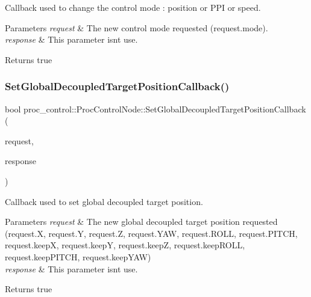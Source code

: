 Callback used to change the control mode \+: position or P\+PI or speed. 
\begin{DoxyParams}{Parameters}
{\em request} & The new control mode requested (request.\+mode). \\
\hline
{\em response} & This parameter isn\textquotesingle{}t use. \\
\hline
\end{DoxyParams}
\begin{DoxyReturn}{Returns}
true 
\end{DoxyReturn}
\mbox{\label{classproc__control_1_1_proc_control_node_a841b03177a02e542bf7f7aa8403c5382}} 
\subsubsection{\texorpdfstring{Set\+Global\+Decoupled\+Target\+Position\+Callback()}{SetGlobalDecoupledTargetPositionCallback()}}
{\footnotesize\ttfamily bool proc\+\_\+control\+::\+Proc\+Control\+Node\+::\+Set\+Global\+Decoupled\+Target\+Position\+Callback (\begin{DoxyParamCaption}\item[{proc\+\_\+control\+::\+Set\+Decoupled\+Target\+Request \&}]{request,  }\item[{proc\+\_\+control\+::\+Set\+Decoupled\+Target\+Response \&}]{response }\end{DoxyParamCaption})}

Callback used to set global decoupled target position. 
\begin{DoxyParams}{Parameters}
{\em request} & The new global decoupled target position requested (request.\+X, request.\+Y, request.\+Z, request.\+Y\+AW, request.\+R\+O\+LL, request.\+P\+I\+T\+CH, request.\+keepX, request.\+keepY, request.\+keepZ, request.\+keep\+R\+O\+LL, request.\+keep\+P\+I\+T\+CH, request.\+keep\+Y\+AW) \\
\hline
{\em response} & This parameter isn\textquotesingle{}t use. \\
\hline
\end{DoxyParams}
\begin{DoxyReturn}{Returns}
true 
\end{DoxyReturn}
\mbox{\label{classproc__control_1_1_proc_control_node_a7890db7144358d5aaf0daa7bfefed964}} 
